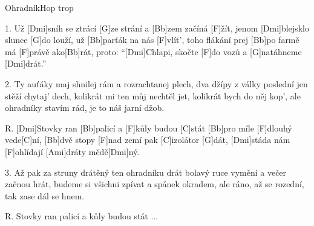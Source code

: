 \begin{song}{Ohradník}{Hop trop}

\begin{xverse}{1. }
Už [Dmi]sníh se ztrácí [G]ze strání a [Bb]zem začíná [F]{žít,}
jenom [Dmi]blejsklo slunce [G]do louží, už [Bb]parťák na nás [F]vlít',
toho flákání prej [Bb]po farmě má [F]právě ako[Bb]rát,
proto: ``[Dmi]Chlapi, skočte [F]do vozů a [G]natáhneme [Dmi]drát.''
\end{xverse}


\begin{xverse}{2. }
Ty auťáky maj shnilej rám a rozrachtanej plech,
dva džípy z války poslední jen stěží chytaj' dech,
kolikrát mi ten můj nechtěl jet, kolikrát bych do něj kop',
ale ohradníky stavím rád, je to náš jarní džob.
\end{xverse}


\begin{xverse}{R. }
[Dmi]Stovky ran [Bb]palicí a [F]kůly budou [C]stát
[Bb]pro míle [F]dlouhý vede[C]ní,
[Bb]dvě stopy [F]nad zemí pak [C]izolátor [G]dát,
[Dmi]stáda nám [F]ohlídají [Ami]dráty mědě[Dmi]ný.
\end{xverse}


\begin{xverse}{3. }
Až pak za struny drátěný ten ohradníku drát
bolavý ruce vymění a večer začnou hrát,
budeme si všichni zpívat a spánek okradem,
ale ráno, až se rozední, tak zase dál se hnem.
\end{xverse}

\begin{xverse}{R. }
Stovky ran palicí a kůly budou stát ...
\end{xverse}

\end{song}

